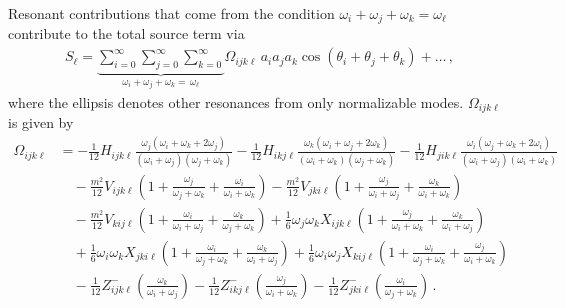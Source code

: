 \documentclass[letterpaper,11pt]{article}
\newcommand{\oi}{\omega_i}
\newcommand{\oj}{\omega_j}
\newcommand{\ok}{\omega_k}
\newcommand{\ol}{\omega_\ell}
\newcommand{\thi}{\theta_i}
\newcommand{\thj}{\theta_j}
\newcommand{\thk}{\theta_k}
\begin{document}
Resonant contributions that come from the condition $\oi + \oj + \ok = \ol$ contribute to the total source term via
\begin{align}
S_\ell = \underbrace{\sum_{i=0}^\infty \sum_{j=0}^\infty \sum_{k=0}^\infty}_{\oi + \oj + \ok = \, \ol} \Omega_{ijk\ell} \, a_i a_j a_k \cos \left( \thi + \thj + \thk \right) + \ldots \, ,
\end{align}
where the ellipsis denotes other resonances from only normalizable modes. $\Omega_{ijk\ell}$ is given by
\begin{align}
\label{omega}
\Omega_{ijk\ell} &= -\frac{1}{12}H_{ijk\ell} \frac{\oj (\oi + \ok +2\oj)}{(\oi + \oj)(\oj + \ok)} - \frac{1}{12} H_{ikj\ell} \frac{\ok (\oi + \oj + 2\ok)}{(\oi + \ok)(\oj + \ok)}- \frac{1}{12} H_{jik\ell} \frac{\oi (\oj + \ok +2\oi)}{(\oi + \oj)(\oi + \ok)} \nonumber \\
%
& \quad - \frac{m^2}{12} V_{ijk\ell} \left( 1 + \frac{\oj}{\oj + \ok} + \frac{\oi}{\oi + \ok} \right) - \frac{m^2}{12} V_{jki\ell} \left( 1 + \frac{\oj}{\oi + \oj} + \frac{\ok}{\oi + \ok} \right) \nonumber \\
%
& \quad - \frac{m^2}{12} V_{kij\ell} \left( 1 + \frac{\oi}{\oi + \oj} + \frac{\ok}{\oj + \ok} \right)  + \frac{1}{6} \oj \ok X_{ijk\ell} \left( 1 + \frac{\oj}{\oi + \ok} + \frac{\ok}{\oi + \oj} \right) \nonumber \\
%
& \quad + \frac{1}{6} \oi \ok X_{jki\ell} \left( 1 + \frac{\oi}{\oj + \ok} + \frac{\ok}{\oi + \oj} \right) + \frac{1}{6} \oi \oj X_{kij\ell} \left( 1 + \frac{\oi}{\oj + \ok} + \frac{\oj}{\oi + \ok} \right) \nonumber \\
%
& \quad - \frac{1}{12} Z^-_{ijk\ell} \left( \frac{\ok}{\oi + \oj} \right) - \frac{1}{12} Z^-_{ikj\ell} \left( \frac{\oj}{\oi + \ok} \right) - \frac{1}{12} Z^-_{jki\ell}  \left( \frac{\oi}{\oj + \ok} \right) \, .
\end{align}
\end{document}
